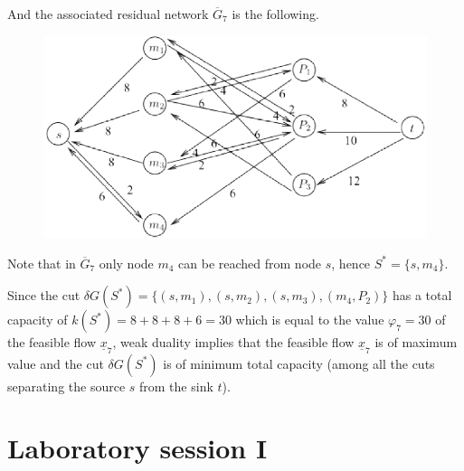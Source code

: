 \documentclass[12pt, a4paper]{report}
\newtheorem[style=M,bodystyle=\normalfont]{theorem}{Theorem}
\newtheorem[style=M,bodystyle=\normalfont]{corollary}{Corollary}
\newtheorem[style=M,bodystyle=\normalfont]{lemma}{Lemma}
\newtheorem[style=M,bodystyle=\normalfont]{definition}{Definition}
\begin{document}
        And the associated residual network $\overline{G}_7$ is the following. 
        \begin{figure}[H]
            \centering
            \includegraphics[width=0.5\linewidth]{images/inflow3.png}
        \end{figure}
        Note that in $\overline{G}_7$ only node $m_4$ can be reached from node $s$, hence $S^{*} = \{s, m_4\}$.
        
        Since the cut $\delta G(S^{*}) = \{(s, m_1),(s, m_2),(s, m_3),(m_4, P_2)\}$ has a total capacity of $k(S^{*}) =8 + 8 + 8 + 6 = 30$ which is equal to the value $\varphi_7 = 30$ of the feasible flow 
        $\underline{x}_7$, weak duality implies that the feasible flow $\underline{x}_7$ is of maximum value and the cut $\delta G(S^{*})$ is of minimum total capacity (among all the cuts separating the source 
        $s$ from the sink $t$).

\newpage

\chapter{Laboratory session I}
\end{document}

